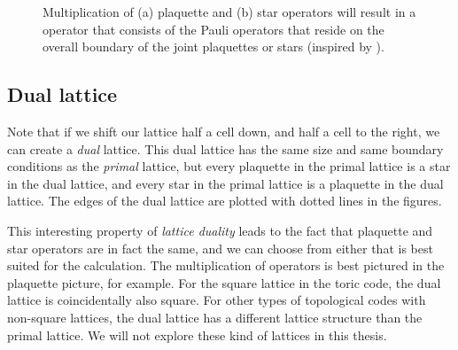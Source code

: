 \begin{figure}
  \centering
  \hspace{1cm}
  \caption{Multiplication of (a) plaquette and (b) star operators will result in a operator that consists of the Pauli operators that reside on the overall boundary of the joint plaquettes or stars (inspired by \cite{browne}).}\label{sf:fig_multistab}
\end{figure}

\subsection{Dual lattice}
Note that if we shift our lattice half a cell down, and half a cell to the right, we can create a \emph{dual} lattice. This dual lattice has the same size and same boundary conditions as the \emph{primal} lattice, but every plaquette in the primal lattice is a star in the dual lattice, and every star in the primal lattice is a plaquette in the dual lattice. The edges of the dual lattice are plotted with dotted lines in the figures.

This interesting property of \emph{lattice duality} leads to the fact that plaquette and star operators are in fact the same, and we can choose from either that is best suited for the calculation. The multiplication of operators is best pictured in the plaquette picture, for example. For the square lattice in the toric code, the dual lattice is coincidentally also square. For other types of topological codes with non-square lattices, the dual lattice has a different lattice structure than the primal lattice. We will not explore these kind of lattices in this thesis.

